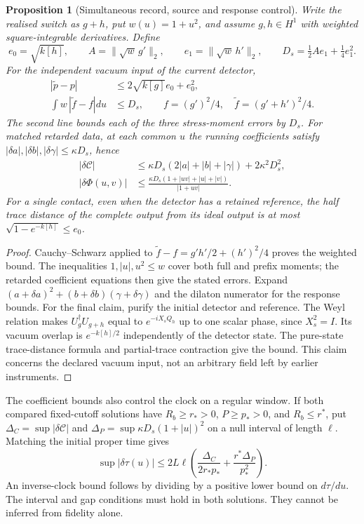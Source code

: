 \documentclass[12pt,a4paper]{article}
\newtheorem{proposition}[theorem]{Proposition}
\begin{document}
\begin{proposition}[Simultaneous record, source and response control]
\label{prop:joint-source-bound}
Write the realised switch as $g+h$, put $w(u)=1+u^2$, and assume
$g,h\in H^1$ with weighted square-integrable derivatives. Define
\[
 e_0=\sqrt{k[h]},\qquad A=\|\sqrt w\,g'\|_2,\qquad
 e_1=\|\sqrt w\,h'\|_2,\qquad D_s=\tfrac12Ae_1+\tfrac14e_1^2.
\]
For the independent vacuum input of the current detector,
\begin{align}
 |\widetilde p-p|&\le2\sqrt{k[g]}e_0+e_0^2,\nonumber\\
 \int w\,|\widetilde f-f|du&\le D_s,\qquad
 f=(g')^2/4,\quad \widetilde f=(g'+h')^2/4.
 \label{eq:joint-source-bound}
\end{align}
The second line bounds each of the three stress-moment errors by $D_s$.
For matched retarded data, at each common $u$ the running coefficients satisfy
$|\delta a|,|\delta b|,|\delta\gamma|\le\kappa D_s$, hence
\begin{align}
 |\delta\mathcal C|&\le
 \kappa D_s(2|a|+|b|+|\gamma|)+2\kappa^2D_s^2,\nonumber\\
 |\delta\Phi(u,v)|&\le
 \frac{\kappa D_s(1+|uv|+|u|+|v|)}{|1+uv|}.
 \label{eq:source-response-certificate}
\end{align}
For a single contact, even when the detector has a retained reference,
the half trace distance of the complete output from its ideal output is at
most $\sqrt{1-e^{-k[h]}}\le e_0$.
\end{proposition}
\begin{proof}
Cauchy--Schwarz applied to
$\widetilde f-f=g'h'/2+(h')^2/4$ proves the weighted bound.
The inequalities $1,|u|,u^2\le w$ cover both full and prefix moments;
the retarded coefficient equations then give the stated errors.
Expand $(a+\delta a)^2+(b+\delta b)(\gamma+\delta\gamma)$ and the
dilaton numerator for the response bounds.
For the final claim, purify the initial detector and reference.
The Weyl relation makes $U_g^\dagger U_{g+h}$ equal to
$e^{-iX_sQ_h}$ up to one scalar phase, since $X_s^2=I$.
Its vacuum overlap is $e^{-k[h]/2}$ independently of the detector state.
The pure-state trace-distance formula and partial-trace contraction give
the bound. This claim concerns the declared vacuum input, not an arbitrary
field left by earlier instruments.
\end{proof}

The coefficient bounds also control the clock on a regular window.
If both compared fixed-cutoff solutions have
$R_b\ge r_*>0$, $P\ge p_*>0$, and $R_b\le r^*$, put
$\Delta_C=\sup|\delta\mathcal C|$ and
$\Delta_P=\sup\kappa D_s(1+|u|)^2$ on a null interval of length $\ell$.
Matching the initial proper time gives
\[
 \sup|\delta\tau(u)|\le
 2L\ell\left(\frac{\Delta_C}{2r_*p_*}
                 +\frac{r^*\Delta_P}{p_*^2}\right).
\]
An inverse-clock bound follows by dividing by a positive lower bound on
$d\tau/du$. The interval and gap conditions must hold in both solutions.
They cannot be inferred from fidelity alone.
\end{document}
